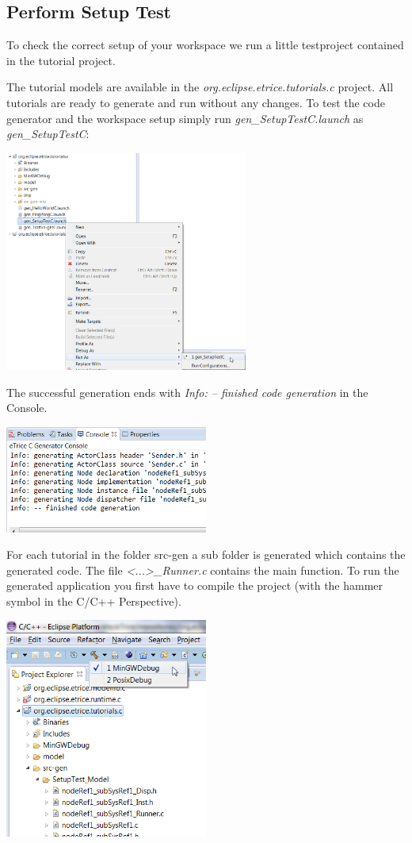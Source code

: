 \subsection{Perform Setup Test}

To check the correct setup of your workspace we run a little testproject contained in the tutorial project.

The tutorial models are available in the  \emph{org.eclipse.etrice.tutorials.c} project. All tutorials are ready to generate and run without any changes. To test the code generator and the workspace setup simply run 
\emph{gen\_SetupTestC.launch} as \emph{gen\_SetupTestC}: 

\includegraphics[width=0.6\textwidth]{images/014-05-gen_SetupTestC.png}

\newpage
The successful generation ends with \emph{Info: -- finished code generation} in the Console.

\includegraphics[width=0.5\textwidth]{images/014-06-FinishedCodeGeneration.png}

For each tutorial in the folder src-gen a sub folder is generated which contains the generated code. The file \emph{<...>\_Runner.c} contains the main function. To run the generated application you first have to compile the project (with the hammer symbol in the C/C++ Perspective).

\includegraphics[width=0.5\textwidth]{images/014-07-Compile.png}

